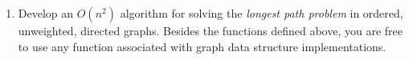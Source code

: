 \documentclass[12pt,letterpaper]{article}
\begin{document}
\begin{enumerate}
    \begin{center}
    \end{center}

    \newpage

    \item Develop an $O(n^2)$ algorithm for solving the  \textit{longest path problem} in ordered, unweighted, directed graphs. 
    Besides the functions defined above, you are free to use any function associated with graph data structure implementations.


\end{enumerate}
\end{document}
